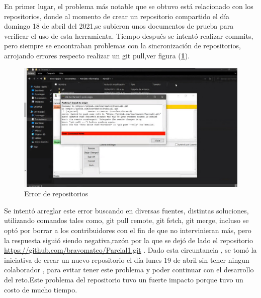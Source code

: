 \documentclass{article}
\begin{document}
En primer lugar, el problema más notable que se obtuvo está relacionado con los repositorios, donde al momento de crear un repositorio compartido el día domingo 18 de abril del 2021,se subieron unos documentos de prueba para verificar el uso de esta herramienta. Tiempo después se intentó  realizar commits, pero siempre se encontraban problemas con la sincronización de repositorios, arrojando errores respecto realizar un git pull,ver figura (\textbf{\ref{repoerror}}).

    \begin{figure}[h]
    \includegraphics[width=15cm]{Error1.jpeg}
    \centering
    \caption{Error de repositorios}
    \label{repoerror}
    \end{figure}
    
Se intentó arreglar este error buscando en diversas fuentes, distintas soluciones, utilizando comandos tales como, git pull remote, git fetch, git merge, incluso se optó por borrar a los contribuidores con el fin de que no intervinieran más, pero la respuesta siguió siendo negativa,razón por la que se dejó de lado el repositorio  \url{https://github.com/bravomateo/Parcial1.git} . Dado esta circuntancia , se tomó la iniciativa de crear un nuevo repositorio el día lunes 19 de abril sin tener ningun colaborador , para evitar tener este problema y poder continuar con el desarrollo del reto.Este problema del repositorio tuvo un fuerte impacto porque tuvo un costo de mucho tiempo.\\






\end{document}
